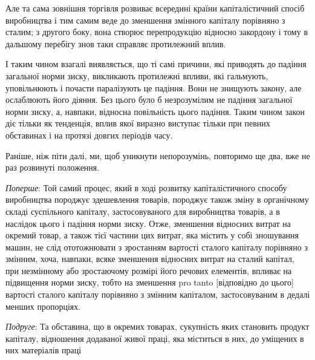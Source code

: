 Але та сама зовнішня торгівля розвиває всередині країни капіталістичний спосіб виробництва і тим
самим веде до зменшення змінного капіталу порівняно з сталим; з другого боку, вона створює
перепродукцію відносно закордону і тому в дальшому перебігу знов таки справляє протилежний вплив.

І таким чином взагалі виявляється, що ті самі причини, які приводять до падіння загальної норми
зиску, викликають протилежні впливи, які гальмують, уповільнюють і почасти паралізують це падіння.
Вони не знищують закону, але ослаблюють його діяння. Без цього було б незрозумілим не падіння
загальної норми зиску, а, навпаки, відносна повільність цього падіння. Таким чином закон діє тільки
як тенденція, вплив якої виразно виступає тільки при певних обставинах і на протязі довгих періодів
часу.

Раніше, ніж піти далі, ми, щоб уникнути непорозумінь, повторимо ще два, вже не раз розвинуті
положення.

\emph{Поперше}: Той самий процес, який в ході розвитку капіталістичного способу виробництва породжує
здешевлення товарів, породжує також зміну в органічному складі суспільного капіталу, застосовуваного
для виробництва товарів, а в наслідок цього і падіння норми зиску. Отже, зменшення відносних витрат
на окремий товар, а також тієї частини цих витрат, яка містить у собі зношування машин, не слід
ототожнювати з зростанням вартості сталого капіталу порівняно з змінним, хоча, навпаки, всяке
зменшення відносних витрат на сталий капітал, при незмінному або зростаючому розмірі його речових
елементів, впливає на підвищення норми зиску, тобто на зменшення pro tanto [відповідно до цього]
вартості сталого капіталу порівняно з змінним капіталом, застосовуваним в дедалі менших пропорціях.

\emph{Подруге}: Та обставина, що в окремих товарах, сукупність яких становить продукт капіталу, відношення
додаваної живої праці, яка міститься в них, до уміщених в них матеріалів праці
\parbreak{}  %
